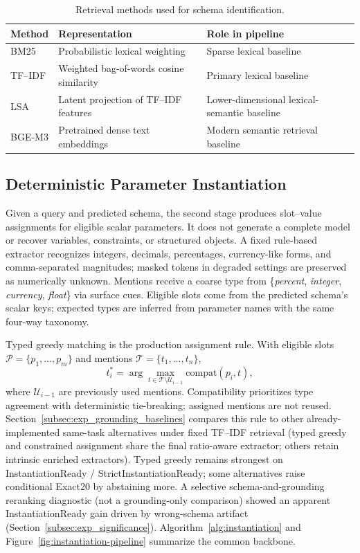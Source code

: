 \documentclass[pdflatex,sn-basic,Numbered]{sn-jnl}
\begin{document}
\begin{table}[t]
\centering
\caption{Retrieval methods used for schema identification.}
\label{tab:retrieval_backbones}
\small
\begin{tabularx}{\linewidth}{l l X}
\toprule
Method & Representation & Role in pipeline \\
\midrule
BM25 & Probabilistic lexical weighting & Sparse lexical baseline \\
TF--IDF & Weighted bag-of-words cosine similarity & Primary lexical baseline \\
LSA & Latent projection of TF--IDF features & Lower-dimensional lexical-semantic baseline \\
BGE-M3 & Pretrained dense text embeddings & Modern semantic retrieval baseline \\
\bottomrule
\end{tabularx}
\end{table}

\subsection{Deterministic Parameter Instantiation}
\label{subsec:method_instantiation}

Given a query and predicted schema, the second stage produces slot--value assignments for eligible scalar parameters. It does not generate a complete model or recover variables, constraints, or structured objects. A fixed rule-based extractor recognizes integers, decimals, percentages, currency-like forms, and comma-separated magnitudes; masked tokens in degraded settings are preserved as numerically unknown. Mentions receive a coarse type from \{\emph{percent}, \emph{integer}, \emph{currency}, \emph{float}\} via surface cues. Eligible slots come from the predicted schema's scalar keys; expected types are inferred from parameter names with the same four-way taxonomy.

Typed greedy matching is the production assignment rule. With eligible slots $\mathcal{P}=\{p_1,\dots,p_m\}$ and mentions $\mathcal{T}=\{t_1,\dots,t_n\}$,
\begin{equation}
t_i^{*} = \arg\max_{t \in \mathcal{T}\setminus \mathcal{U}_{i-1}} \mathrm{compat}(p_i,t),
\label{eq:typed_assignment}
\end{equation}
where $\mathcal{U}_{i-1}$ are previously used mentions. Compatibility prioritizes type agreement with deterministic tie-breaking; assigned mentions are not reused. Section~\ref{subsec:exp_grounding_baselines} compares this rule to other already-implemented same-task alternatives under fixed TF--IDF retrieval (typed greedy and constrained assignment share the final ratio-aware extractor; others retain intrinsic enriched extractors). Typed greedy remains strongest on InstantiationReady / StrictInstantiationReady; some alternatives raise conditional Exact20 by abstaining more. A selective schema-and-grounding reranking diagnostic (not a grounding-only comparison) showed an apparent InstantiationReady gain driven by wrong-schema artifact (Section~\ref{subsec:exp_significance}). Algorithm~\ref{alg:instantiation} and Figure~\ref{fig:instantiation-pipeline} summarize the common backbone.
\end{document}
